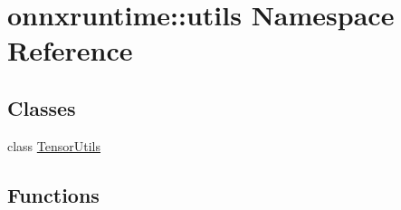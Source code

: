 \hypertarget{namespaceonnxruntime_1_1utils}{}\section{onnxruntime\+:\+:utils Namespace Reference}
\label{namespaceonnxruntime_1_1utils}
\subsection*{Classes}
\begin{DoxyCompactItemize}
\item 
class \mbox{\hyperlink{classonnxruntime_1_1utils_1_1TensorUtils}{Tensor\+Utils}}
\end{DoxyCompactItemize}
\subsection*{Functions}
